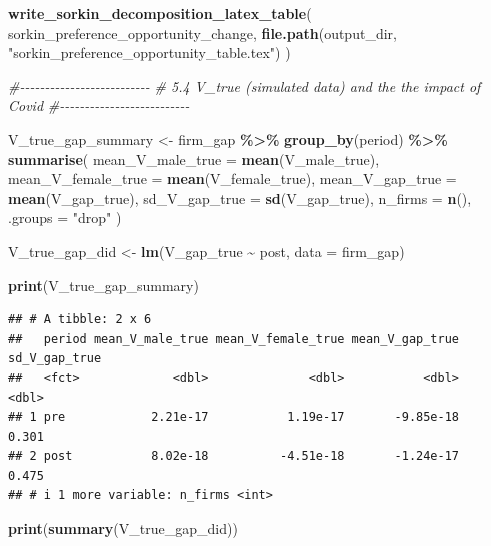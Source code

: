 \documentclass[
]{article}
\newenvironment{Shaded}{\begin{snugshade}}{\end{snugshade}}
\newcommand{\AttributeTok}[1]{\textcolor[rgb]{0.13,0.29,0.53}{#1}}
\newcommand{\CommentTok}[1]{\textcolor[rgb]{0.56,0.35,0.01}{\textit{#1}}}
\newcommand{\FunctionTok}[1]{\textcolor[rgb]{0.13,0.29,0.53}{\textbf{#1}}}
\newcommand{\NormalTok}[1]{#1}
\newcommand{\OtherTok}[1]{\textcolor[rgb]{0.56,0.35,0.01}{#1}}
\newcommand{\SpecialCharTok}[1]{\textcolor[rgb]{0.81,0.36,0.00}{\textbf{#1}}}
\newcommand{\StringTok}[1]{\textcolor[rgb]{0.31,0.60,0.02}{#1}}
\begin{document}
\begin{Shaded}
\begin{Highlighting}[]
\FunctionTok{write\_sorkin\_decomposition\_latex\_table}\NormalTok{(}
\NormalTok{    sorkin\_preference\_opportunity\_change,}
    \FunctionTok{file.path}\NormalTok{(output\_dir, }\StringTok{"sorkin\_preference\_opportunity\_table.tex"}\NormalTok{)}
\NormalTok{)}

\CommentTok{\#{-}{-}{-}{-}{-}{-}{-}{-}{-}{-}{-}{-}{-}{-}{-}{-}{-}{-}{-}{-}{-}{-}{-}{-}{-}{-}}
\CommentTok{\# 5.4 V\_true (simulated data) and the the impact of Covid}
\CommentTok{\#{-}{-}{-}{-}{-}{-}{-}{-}{-}{-}{-}{-}{-}{-}{-}{-}{-}{-}{-}{-}{-}{-}{-}{-}{-}{-}}

\NormalTok{V\_true\_gap\_summary }\OtherTok{\textless{}{-}}\NormalTok{ firm\_gap }\SpecialCharTok{\%\textgreater{}\%}
    \FunctionTok{group\_by}\NormalTok{(period) }\SpecialCharTok{\%\textgreater{}\%}
    \FunctionTok{summarise}\NormalTok{(}
        \AttributeTok{mean\_V\_male\_true =} \FunctionTok{mean}\NormalTok{(V\_male\_true),}
        \AttributeTok{mean\_V\_female\_true =} \FunctionTok{mean}\NormalTok{(V\_female\_true),}
        \AttributeTok{mean\_V\_gap\_true =} \FunctionTok{mean}\NormalTok{(V\_gap\_true),}
        \AttributeTok{sd\_V\_gap\_true =} \FunctionTok{sd}\NormalTok{(V\_gap\_true),}
        \AttributeTok{n\_firms =} \FunctionTok{n}\NormalTok{(),}
        \AttributeTok{.groups =} \StringTok{"drop"}
\NormalTok{    )}

\NormalTok{V\_true\_gap\_did }\OtherTok{\textless{}{-}} \FunctionTok{lm}\NormalTok{(V\_gap\_true }\SpecialCharTok{\textasciitilde{}}\NormalTok{ post, }\AttributeTok{data =}\NormalTok{ firm\_gap)}

\FunctionTok{print}\NormalTok{(V\_true\_gap\_summary)}
\end{Highlighting}
\end{Shaded}

\begin{verbatim}
## # A tibble: 2 x 6
##   period mean_V_male_true mean_V_female_true mean_V_gap_true sd_V_gap_true
##   <fct>             <dbl>              <dbl>           <dbl>         <dbl>
## 1 pre            2.21e-17           1.19e-17       -9.85e-18         0.301
## 2 post           8.02e-18          -4.51e-18       -1.24e-17         0.475
## # i 1 more variable: n_firms <int>
\end{verbatim}

\begin{Shaded}
\begin{Highlighting}[]
\FunctionTok{print}\NormalTok{(}\FunctionTok{summary}\NormalTok{(V\_true\_gap\_did))}
\end{Highlighting}
\end{Shaded}
\end{document}
